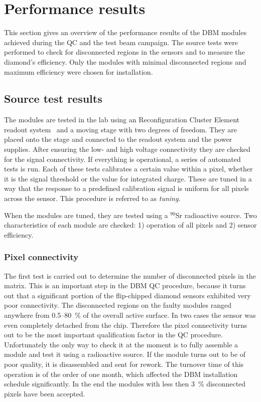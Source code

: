 \section{Performance results}
\label{sec:perfresults}
This section gives an overview of the performance results of the DBM modules achieved during the QC and the test beam campaign. The source tests were performed to check for disconnected regions in the sensors and to measure the diamond's efficiency. Only the modules with minimal disconnected regions and maximum efficiency were chosen for installation. 


\subsection{Source test results}
The modules are tested in the lab using an Reconfiguration Cluster Element readout system~\cite{Claus:2021543} and a moving stage with two degrees of freedom. They are placed onto the stage and connected to the readout system and the power supplies. After ensuring the low- and high voltage connectivity they are checked for the signal connectivity. If everything is operational, a series of automated tests is run. Each of these tests calibrates a certain value within a pixel, whether it is the signal threshold or the value for integrated charge. These are tuned in a way that the response to a predefined calibration signal is uniform for all pixels across the sensor. This procedure is referred to as \emph{tuning}. 

When the modules are tuned, they are tested using a $^{90}$Sr radioactive source. Two characteristics of each module are checked: 1) operation of all pixels and 2) sensor efficiency. 


\subsubsection{Pixel connectivity}
The first test is carried out to determine the number of disconnected pixels in the matrix.
This is an important step in the DBM QC procedure, because it turns out that a significant portion of the flip-chipped diamond sensors exhibited very poor connectivity. The disconnected regions on the faulty modules ranged anywhere from 0.5--80~\% of the overall active surface. In two cases the sensor was even completely detached from the chip. Therefore the pixel connectivity turns out to be the most important qualification factor in the QC procedure. Unfortunately the only way to check it at the moment is to fully assemble a module and test it using a radioactive source. If the module turns out to be of poor quality, it is disassembled and sent for rework. The turnover time of this operation is of the order of one month, which affected the DBM installation schedule significantly. In the end the modules with less then 3~\% disconnected pixels have been accepted.

